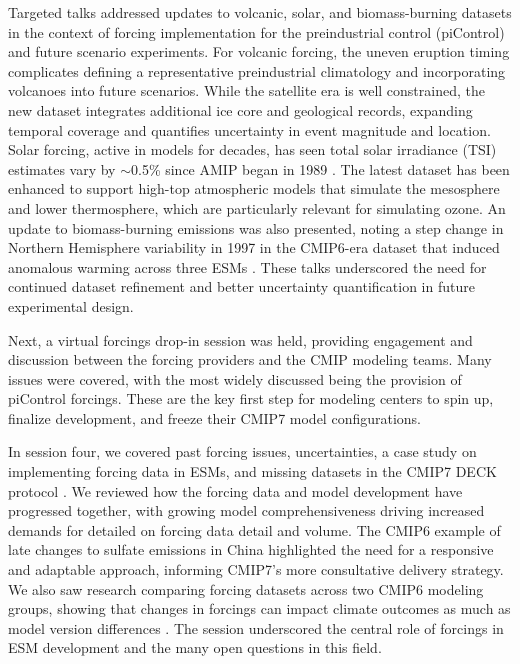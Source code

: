 \documentclass{ametsocV6.1}
\begin{document}
Targeted talks addressed updates to volcanic, solar, and biomass-burning datasets in the context of forcing implementation for the preindustrial control (piControl) and future scenario experiments. For volcanic forcing, the uneven eruption timing complicates defining a representative preindustrial climatology and incorporating volcanoes into future scenarios. While the satellite era is well constrained, the new dataset integrates additional ice core and geological records, expanding temporal coverage and quantifies uncertainty in event magnitude and location. Solar forcing, active in models for decades, has seen total solar irradiance (TSI) estimates vary by $\sim$0.5\% since AMIP began in 1989 \citep{durack_coupled_2025}. The latest dataset has been enhanced to support high-top atmospheric models that simulate the mesosphere and lower thermosphere, which are particularly relevant for simulating ozone. An update to biomass-burning emissions was also presented, noting a step change in Northern Hemisphere variability in 1997 in the CMIP6-era dataset that induced anomalous warming across three ESMs \cite[e.g.,][]{fasullo_overview_2024,holland_new_2024}. These talks underscored the need for continued dataset refinement and better uncertainty quantification in future experimental design.

Next, a virtual forcings drop-in session was held, providing engagement and discussion between the forcing providers and the CMIP modeling teams. Many issues were covered, with the most widely discussed being the provision of piControl forcings. These are the key first step for modeling centers to spin up, finalize development, and freeze their CMIP7 model configurations.

In session four, we covered past forcing issues, uncertainties, a case study on implementing forcing data in ESMs, and missing datasets in the CMIP7 DECK protocol \citep{dunne_evolving_2024}. We reviewed how the forcing data and model development have progressed together, with growing model comprehensiveness driving increased demands for detailed on forcing data detail and volume. The CMIP6 example of late changes to sulfate emissions in China highlighted the need for a responsive and adaptable approach, informing CMIP7’s more consultative delivery strategy. We also saw research comparing forcing datasets across two CMIP6 modeling groups, showing that changes in forcings can impact climate outcomes as much as model version differences \citep{fyfe_significant_2021,holland_new_2024}. The session underscored the central role of forcings in ESM development and the many open questions in this field.
\end{document}
